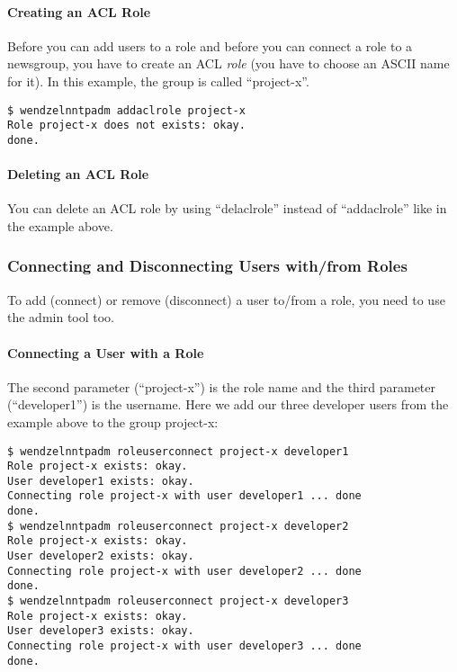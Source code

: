 \documentclass[12pt,fleqn,leqno]{scrbook}
\begin{document}
\hypertarget{creating-an-acl-role}{%
\paragraph{Creating an ACL Role}\label{creating-an-acl-role}}

Before you can add users to a role and before you can connect a role to
a newsgroup, you have to create an ACL \emph{role} (you have to choose
an ASCII name for it). In this example, the group is called
``project-x''.

\begin{verbatim}
$ wendzelnntpadm addaclrole project-x
Role project-x does not exists: okay.
done.
\end{verbatim}

\hypertarget{deleting-an-acl-role}{%
\paragraph{Deleting an ACL Role}\label{deleting-an-acl-role}}

You can delete an ACL role by using ``delaclrole'' instead of
``addaclrole'' like in the example above.

\hypertarget{connecting-and-disconnecting-users-withfrom-roles}{%
\subsubsection{Connecting and Disconnecting Users with/from
Roles}\label{connecting-and-disconnecting-users-withfrom-roles}}

To add (connect) or remove (disconnect) a user to/from a role, you need
to use the admin tool too.

\hypertarget{connecting-a-user-with-a-role}{%
\paragraph{Connecting a User with a
Role}\label{connecting-a-user-with-a-role}}

The second parameter (``project-x'') is the role name and the third
parameter (``developer1'') is the username. Here we add our three
developer users from the example above to the group project-x:

\begin{verbatim}
$ wendzelnntpadm roleuserconnect project-x developer1
Role project-x exists: okay.
User developer1 exists: okay.
Connecting role project-x with user developer1 ... done
done.
$ wendzelnntpadm roleuserconnect project-x developer2
Role project-x exists: okay.
User developer2 exists: okay.
Connecting role project-x with user developer2 ... done
done.
$ wendzelnntpadm roleuserconnect project-x developer3
Role project-x exists: okay.
User developer3 exists: okay.
Connecting role project-x with user developer3 ... done
done.
\end{verbatim}
\end{document}
